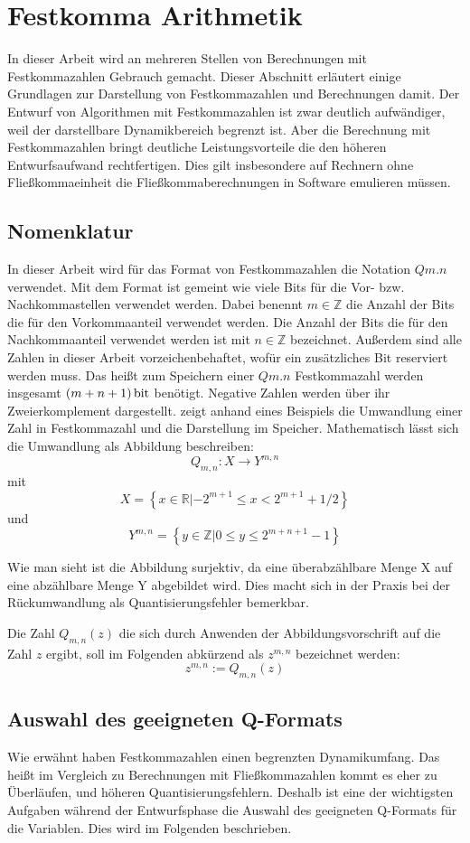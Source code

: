 \chapter{Festkomma Arithmetik}
In dieser Arbeit wird an mehreren Stellen von Berechnungen mit Festkommazahlen Gebrauch gemacht. Dieser Abschnitt erläutert einige Grundlagen zur Darstellung von Festkommazahlen und Berechnungen damit. Der Entwurf von Algorithmen mit Festkommazahlen ist zwar deutlich aufwändiger, weil der darstellbare Dynamikbereich begrenzt ist. Aber die Berechnung mit Festkommazahlen bringt deutliche Leistungsvorteile die den höheren Entwurfsaufwand rechtfertigen. Dies gilt insbesondere auf Rechnern ohne Fließkommaeinheit die Fließkommaberechnungen in Software emulieren müssen.


\section{Nomenklatur}

In dieser Arbeit wird für das Format von Festkommazahlen die Notation $Qm.n$ verwendet. Mit dem Format ist gemeint wie viele Bits für die Vor- bzw. Nachkommastellen verwendet werden. Dabei benennt $m \in \mathbb{Z}$ die Anzahl der Bits die für den Vorkommaanteil verwendet werden. Die Anzahl der Bits die für den Nachkommaanteil verwendet werden ist mit $n \in \mathbb{Z}$ bezeichnet.
Außerdem sind alle Zahlen in dieser Arbeit vorzeichenbehaftet, wofür ein zusätzliches Bit reserviert werden muss. Das heißt zum Speichern einer $Qm.n$ Festkommazahl werden insgesamt $(m+n+1)\,\si{\bit}$ benötigt. Negative Zahlen werden über ihr Zweierkomplement dargestellt.  zeigt anhand eines Beispiels die Umwandlung einer Zahl in Festkommazahl und die Darstellung im Speicher.
Mathematisch lässt sich die Umwandlung als Abbildung beschreiben: 
\[Q_{m,n}: X \rightarrow Y^{m,n}\] 
mit \[X =\left\{x \in \mathbb{R}| -2^{m+1}\leq x<2^{m+1}+1/2\right\}\] und \[Y^{m,n} =\left\{y \in \mathbb{Z} | 0 \leq y \leq 2^{m+n+1}-1\right\}\]

Wie man sieht ist die Abbildung surjektiv, da eine überabzählbare Menge X auf eine abzählbare Menge Y abgebildet wird. Dies macht sich in der Praxis bei der Rückumwandlung als Quantisierungsfehler bemerkbar.

Die Zahl $Q_{m,n}(z)$ die sich durch Anwenden der Abbildungsvorschrift auf die Zahl $z$ ergibt, soll im Folgenden abkürzend als $z^{m,n}$ bezeichnet werden:
\[z^{m,n}:=Q_{m,n}(z)\]

\section{Auswahl des geeigneten Q-Formats}
Wie erwähnt haben Festkommazahlen einen begrenzten Dynamikumfang. Das heißt im Vergleich zu Berechnungen mit Fließkommazahlen kommt es eher zu Überläufen, und höheren Quantisierungsfehlern. Deshalb ist eine der wichtigsten Aufgaben während der Entwurfsphase die Auswahl des geeigneten Q-Formats für die Variablen. Dies wird im Folgenden beschrieben.

